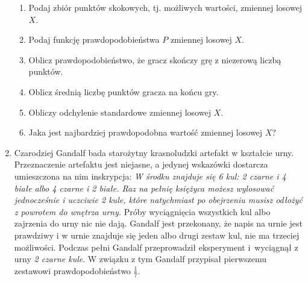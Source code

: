 \documentclass[twoside]{mwart}
\newcommand{\ans}[1]{}
\newcommand{\ans}[1]{\par\emph{Odpowiedź:} #1}
\begin{document}
\begin{enumerate}
\begin{enumerate}
	\item Podaj zbiór punktów skokowych, tj. możliwych wartości, zmiennej losowej $X$.
	\ans{$\{0, 2, 4, \ldots, 2^{n}, \ldots\}=\{0\}\cup\{2^n\colon n\in\mathbb{N}_{+} \}$}
	\item Podaj funkcję prawdopodobieństwa $P$ zmiennej losowej $X$.
	\ans{
		\[
		P(X=k)=\begin{cases} 
		\left(\frac{1}{3}\right)^{n-1}\frac{1}{2} & k=2^n\, n\in\mathbb{N}_{+} \\
		\frac{1}{4} & k=0\quad \text{(wyprowadzenie niżej)}
		\end{cases} \]
	}
	\item Oblicz prawdopodobieństwo, że gracz skończy grę z niezerową liczbą punktów.
	\ans{\[P(X>0)=\sum_{n=1}^\infty \left(\frac{1}{3}\right)^{n-1}\frac{1}{2}=
		\frac{1}{2}\sum_{n=0}^\infty \left(\frac{1}{3}\right)^n = \frac{1}{2}\cdot \frac{1}{1-\frac{1}{3}}=\frac{3}{4} \]}
	\item Oblicz średnią liczbę punktów gracza na końcu gry.
	\ans{\[
		EX = \sum_{n=1}^\infty 2^{n}\left(\frac{1}{3}\right)^{n-1}\frac{1}{2} = \sum_{n=1}^\infty \left(\frac{2}{3}\right)^{n-1} = \sum_{n=0}^\infty \left(\frac{2}{3}\right)^n = \frac{1}{1-\frac{2}{3}} = 3
		\]}
	\item Obliczy odchylenie standardowe zmiennej losowej $X$.
	\ans{$DX=\sqrt{E(X^2)-(EX)^2}$ \\
		\[
		EX^2=\sum_{n=1}^\infty \left(2^{n}\right)^2\left(\frac{1}{3}\right)^{n-1}\frac{1}{2} =
		\frac{1}{2} \sum_{n=1}^\infty 4^{n}\left(\frac{1}{3}\right)^{n-1} =
		\frac{4}{2} \sum_{n=1}^\infty 4^{n-1}\left(\frac{1}{3}\right)^{n-1} =
		\frac{1}{2} \sum_{n=0}^\infty \left(\frac{4}{3}\right)^n \to\infty
		\]
		Wyciągamy z tego wniosek, że nie można obliczyć odchylenia standardowego tej zmiennej losowej.
	}
	\item Jaka jest najbardziej prawdopodobna wartość zmiennej losowej $X$? 
	\ans{2}
\end{enumerate}
	
	\item Czarodziej Gandalf bada starożytny krasnoludzki artefakt w kształcie urny.
	Przeznaczenie artefaktu jest niejasne, a jedynej wskazówki dostarcza umieszczona na nim inskrypcja: 
	\emph{W środku znajduje się 6 kul: 2 czarne i 4 białe albo 4 czarne i 2 białe.
		Raz na pełnię księżyca możesz wylosować jednocześnie i uczciwie 2 kule, które natychmiast po obejrzeniu musisz odłożyć z powrotem do wnętrza urny.}
	Próby wyciągnięcia wszystkich kul albo zajrzenia do urny nic nie dają.
	Gandalf jest przekonany, że napis na urnie jest prawdziwy i w urnie znajduje się jeden albo drugi zestaw kul, nie ma trzeciej możliwości.
	Podczas pełni Gandalf przeprowadził eksperyment i~wyciągnął z urny \emph{2 czarne kule}.
	W związku z tym Gandalf przypisał pierwszemu zestawowi prawdopodobieństwo $\frac{1}{7}$.
	

\end{enumerate}
\end{document}
